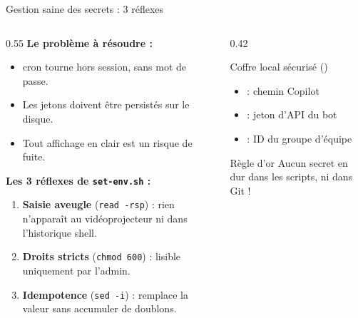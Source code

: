 \documentclass[aspectratio=169,10pt,t]{beamer}
\begin{document}
\begin{frame}[fragile]{Gestion saine des secrets : 3 r\'eflexes}
\begin{columns}[T]\begin{column}{0.55\textwidth}
\textbf{Le probl\`eme \`a r\'esoudre :}
\begin{itemize}
\item cron tourne hors session, sans mot de passe.
\item Les jetons doivent \^etre persist\'es sur le disque.
\item Tout affichage en clair est un risque de fuite.
\end{itemize}
\vspace{0.25cm}
\textbf{Les 3 r\'eflexes de \texttt{set-env.sh} :}
\begin{enumerate}
\item \textbf{Saisie aveugle} (\texttt{read -rsp}) : rien n'appara\^it au vid\'eoprojecteur ni dans l'historique shell.
\item \textbf{Droits stricts} (\texttt{chmod 600}) : lisible uniquement par l'admin.
\item \textbf{Idempotence} (\texttt{sed -i}) : remplace la valeur sans accumuler de doublons.
\end{enumerate}
\end{column}\begin{column}{0.42\textwidth}
\begin{block}{Coffre local s\'ecuris\'e}
 ()
\begin{itemize}
\item {} : chemin Copilot
\item {} : jeton d'API du bot
\item {} : ID du groupe d'\'equipe
\end{itemize}
\end{block}
\begin{exampleblock}{R\`egle d'or}
Aucun secret en dur dans les scripts, ni dans Git !
\end{exampleblock}
\end{column}\end{columns}
\end{frame}
\end{document}
